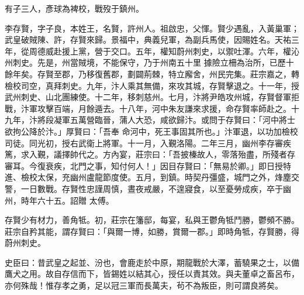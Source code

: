 \begin{pinyinscope}
 有子三人，彥球為裨校，戰歿于鎮州。



 李存賢，字子良，本姓王，名賢，許州人。祖啟忠，父惲。賢少遇亂，入黃巢軍；武皇破賊陳、許，存賢來歸。景福中，典義兒軍，為副兵馬使，因賜姓名。天祐三年，從周德威赴援上黨，營于交口。五年，權知蔚州刺史，以禦吐渾。六年，權沁州刺史。先是，州當賊境，不能保守，乃于州南五十里
 據險立柵為治所，已歷十餘年矣。存賢至郡，乃移復舊郡，劃闢荊棘，特立廨舍，州民完集。莊宗嘉之，轉檢校司空，真拜刺史。九年，汴人乘其無備，來攻其城，存賢擊退之。十一年，授武州刺史、山北團練使。十二年，移刺慈州。七月，汴將尹皓攻州城，存賢督軍拒戰，汴軍攻擊百端，月餘遁去。十八年，河中朱友謙來求援，命存賢率師赴之。十九年，汴將段凝軍五萬營臨晉，蒲人大恐，咸欲歸汴。或問于存賢曰：「河中將士欲拘公降於汴。」厚賢曰：「吾奉
 命河中，死王事固其所也。」汴軍退，以功加檢校司徒。同光初，授右武衛上將軍。十一月，入覲洛陽。二年三月，幽州李存審疾篤，求入覲，議擇帥代之。方內宴，莊宗曰：「吾披榛故人，零落殆盡，所殘者存審耳。今復衰疾，北門之事，知付何人！」因目存賢曰：「無易於卿。」即日授特進、檢校太保，充幽州盧龍節度使。五月，到鎮。時契丹彊盛，城門之外，烽塵交警，一日數戰。存賢性忠謹周慎，晝夜戒嚴，不遑寢食，以至憂勞成疾，卒于幽州，時年六十五。詔贈
 太傅。



 存賢少有材力，善角牴。初，莊宗在籓邸，每宴，私與王鬱角牴鬥勝，鬱頻不勝。莊宗自矜其能，謂存賢曰：「與爾一博，如勝，賞爾一郡。」即時角牴，存賢勝，得蔚州刺史。



 史臣曰：昔武皇之起並、汾也，會鹿走於中原，期龍戰於大澤，蓄驍果之士，以備鷹犬之用。故自存信而下，皆錫姓以結其心，授任以責其效。與夫董卓之畜呂布，亦何殊哉！惟存孝之勇，足以冠三軍而長萬夫，茍不為叛臣，則可謂良將矣。



\end{pinyinscope}